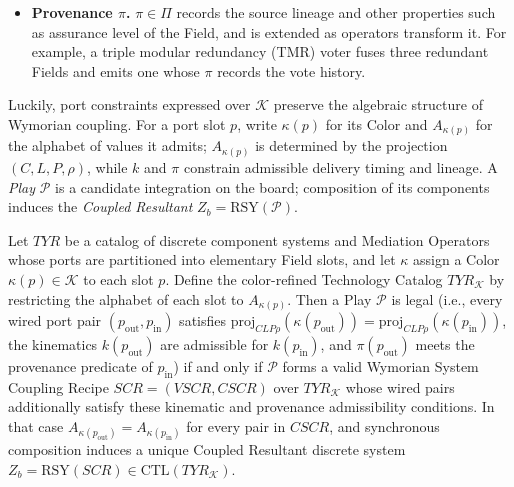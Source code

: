 \begin{itemize}[topsep=2pt, itemsep=1pt, leftmargin=1.8em]
    \item \textbf{Provenance $\pi$.} $\pi \in \Pi$ records the source lineage and other properties such as assurance level of the Field, and is extended as operators transform it.  For example, a triple modular redundancy (TMR) voter fuses three redundant Fields and emits one whose $\pi$ records the vote history.
\end{itemize}

Luckily, port constraints expressed over $\mathcal{K}$ preserve the algebraic structure of Wymorian coupling.  For a port slot $p$, write $\kappa(p)$ for its Color and $A_{\kappa(p)}$ for the alphabet of values it admits; $A_{\kappa(p)}$ is determined by the projection $(C, L, P, \rho)$, while $k$ and $\pi$ constrain admissible delivery timing and lineage.  A \emph{Play} $\mathcal{P}$ is a candidate integration on the board; composition of its components induces the \emph{Coupled Resultant} $Z_b = \mathrm{RSY}(\mathcal{P})$.

\begin{proposition} \label{prop:wymore-iso}
Let $TYR$ be a catalog of discrete component systems and Mediation Operators whose ports are partitioned into elementary Field slots, and let $\kappa$ assign a Color $\kappa(p) \in \mathcal{K}$ to each slot $p$.  Define the color-refined Technology Catalog $TYR_{\mathcal{K}}$ by restricting the alphabet of each slot to $A_{\kappa(p)}$.  Then a Play $\mathcal{P}$ is legal (i.e., every wired port pair $(p_{\text{out}}, p_{\text{in}})$ satisfies $\mathrm{proj}_{CL P\rho}(\kappa(p_{\text{out}})) = \mathrm{proj}_{CL P\rho}(\kappa(p_{\text{in}}))$, the kinematics $k(p_{\text{out}})$ are admissible for $k(p_{\text{in}})$, and $\pi(p_{\text{out}})$ meets the provenance predicate of $p_{\text{in}}$) if and only if $\mathcal{P}$ forms a valid Wymorian System Coupling Recipe $SCR = (VSCR, CSCR)$ over $TYR_{\mathcal{K}}$ whose wired pairs additionally satisfy these kinematic and provenance admissibility conditions.  In that case $A_{\kappa(p_{\text{out}})} = A_{\kappa(p_{\text{in}})}$ for every pair in $CSCR$, and synchronous composition induces a unique Coupled Resultant discrete system $Z_b = \mathrm{RSY}(SCR) \in \mathrm{CTL}(TYR_{\mathcal{K}})$.
\end{proposition}


